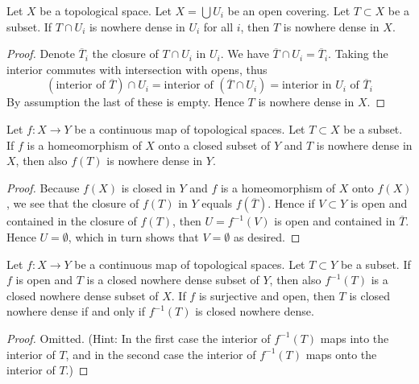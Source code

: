\begin{lemma}
\label{lemma-nowhere-dense-local}
Let $X$ be a topological space.
Let $X = \bigcup U_i$ be an open covering.
Let $T \subset X$ be a subset.
If $T \cap U_i$ is nowhere dense in $U_i$ for all $i$,
then $T$ is nowhere dense in $X$.
\end{lemma}

\begin{proof}
Denote $\overline{T}_i$ the closure of $T \cap U_i$ in $U_i$.
We have $\overline{T} \cap U_i = \overline{T}_i$.
Taking the interior commutes with intersection with opens, thus
$$
(\text{interior of }\overline{T}) \cap U_i =
\text{interior of }(\overline{T} \cap U_i) =
\text{interior in }U_i\text{ of }\overline{T}_i
$$
By assumption the last of these is empty. Hence
$T$ is nowhere dense in $X$.
\end{proof}

\begin{lemma}
\label{lemma-closed-image-nowhere-dense}
Let $f : X \to Y$ be a continuous map of topological spaces.
Let $T \subset X$ be a subset.
If $f$ is a homeomorphism of $X$ onto a closed subset of $Y$
and $T$ is nowhere dense in $X$, then also $f(T)$ is nowhere dense in $Y$.
\end{lemma}

\begin{proof}
Because $f(X)$ is closed in $Y$ and $f$ is a homeomorphism of $X$
onto $f(X)$, we see that the closure of $f(T)$ in $Y$ equals $f(\overline{T})$.
Hence if $V \subset Y$ is open and contained in the closure of $f(T)$,
then $U = f^{-1}(V)$ is open and contained in $\overline{T}$.
Hence $U = \emptyset$, which in turn shows that $V = \emptyset$
as desired.
\end{proof}

\begin{lemma}
\label{lemma-open-inverse-image-closed-nowhere-dense}
Let $f : X \to Y$ be a continuous map of topological spaces.
Let $T \subset Y$ be a subset.
If $f$ is open and $T$ is a closed nowhere dense subset of $Y$,
then also $f^{-1}(T)$ is a closed nowhere dense subset of $X$.
If $f$ is surjective and open, then
$T$ is closed nowhere dense if and only
if $f^{-1}(T)$ is closed nowhere dense.
\end{lemma}

\begin{proof}
Omitted. (Hint: In the first case the interior of $f^{-1}(T)$
maps into the interior of $T$, and in the second case the interior of
$f^{-1}(T)$ maps onto the interior of $T$.)
\end{proof}






